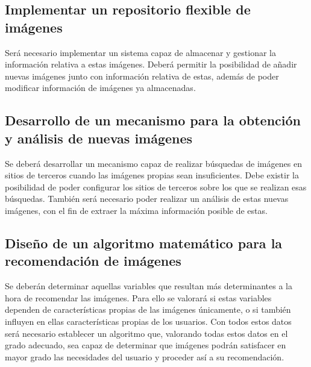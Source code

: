 \subsection{Implementar un repositorio flexible de imágenes}
Será necesario implementar un sistema capaz de almacenar y gestionar la información relativa a estas imágenes. Deberá permitir la posibilidad de añadir nuevas imágenes junto con información relativa de estas, además de poder modificar información de imágenes ya almacenadas.

\subsection{Desarrollo de un mecanismo para la obtención y análisis de nuevas imágenes}
Se deberá desarrollar un mecanismo capaz de realizar búsquedas de imágenes en sitios de terceros cuando las imágenes propias sean insuficientes. Debe existir la posibilidad de poder configurar los sitios de terceros sobre los que se realizan esas búsquedas. También será necesario poder realizar un análisis de estas nuevas imágenes, con el fin de extraer la máxima información posible de estas.

\subsection{Diseño de un algoritmo matemático para la recomendación de imágenes}
Se deberán determinar aquellas variables que resultan más determinantes a la hora de recomendar las imágenes. Para ello se valorará si estas variables dependen de características propias de las imágenes únicamente, o si también influyen en ellas características propias de los usuarios. Con todos estos datos será necesario establecer un algoritmo que, valorando todas estos datos en el grado adecuado, sea capaz de determinar que imágenes podrán satisfacer en mayor grado las necesidades del usuario y proceder así a su recomendación.




